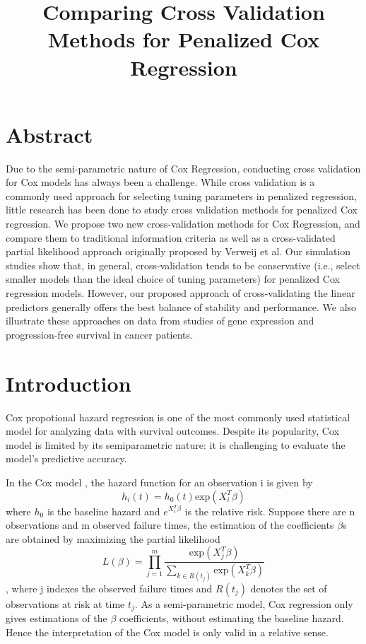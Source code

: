 \documentclass{article}\usepackage[]{graphicx}\usepackage[]{color}
\title{Comparing Cross Validation Methods for Penalized Cox Regression}
\author{
}
\date{ }
\begin{document}
\maketitle

\section*{Abstract}
Due to the semi-parametric nature of Cox Regression, conducting cross validation for Cox models has always been a challenge. While cross validation is a commonly used approach for selecting tuning parameters in penalized regression, little research has been done to study cross validation methods for penalized Cox regression. We propose two new cross-validation methods for Cox Regression, and compare them to traditional information criteria as well as a cross-validated partial likelihood approach originally proposed by Verweij et al. Our simulation studies show that, in general, cross-validation tends to be conservative (i.e., select smaller models than the ideal choice of tuning parameters) for penalized Cox regression models. However, our proposed approach of cross-validating the linear predictors generally offers the best balance of stability and performance. We also illustrate these approaches on data from studies of gene expression and progression-free survival in cancer patients.

\section{Introduction}
Cox propotional hazard regression is one of the most commonly used statistical model for analyzing data with survival outcomes. Despite its popularity, Cox model is limited by its semiparametric nature: it is challenging to evaluate the model's predictive accuracy.

In the Cox model \citep{Cox1975}, the hazard function for an observation i is given by \begin{equation}h_{i}(t) = h_{0}(t) \text{exp}( X_{i}^{T} \beta)\end{equation} where $h_{0}$ is the baseline hazard and $e^{X_{i}^{T} \beta}$ is the relative risk. Suppose there are n observations and m observed failure times, the estimation of the coefficients $\beta$s are obtained by maximizing the partial likelihood \begin{equation}L(\beta) = \prod_{j=1}^{m} \frac{\text{exp} ( X_{j}^{T} \beta)}{\sum_{ k \in R(t_{j})}\text{exp} ( X_{k}^{T} \beta)}\end{equation}, where j indexes the observed failure times and $R(t_{j})$ denotes the set of observations at risk at time $t_{j}$. As a semi-parametric model, Cox regression only gives estimations of the $\beta$ coefficients, without estimating the baseline hazard. Hence the interpretation of the Cox model is only valid in a relative sense.
\end{document}
